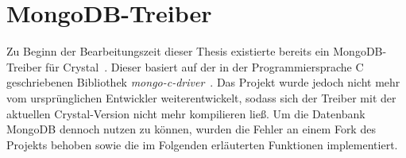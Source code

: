 \section{MongoDB-Treiber}
\label{sec:b_mongodb_treiber}

Zu Beginn der Bearbeitungszeit dieser Thesis existierte bereits ein
MongoDB-Treiber für Crystal~\cite{mongocr}.  Dieser basiert auf der in der
Programmiersprache C geschriebenen Bibliothek
\emph{mongo-c-driver}~\cite{libmongoc}.  Das Projekt wurde jedoch nicht mehr
vom ursprünglichen Entwickler weiterentwickelt, sodass sich der Treiber mit der
aktuellen Crystal-Version nicht mehr kompilieren ließ.  Um die Datenbank MongoDB
dennoch nutzen zu können, wurden die Fehler an einem Fork des Projekts behoben
sowie die im Folgenden erläuterten Funktionen implementiert.



